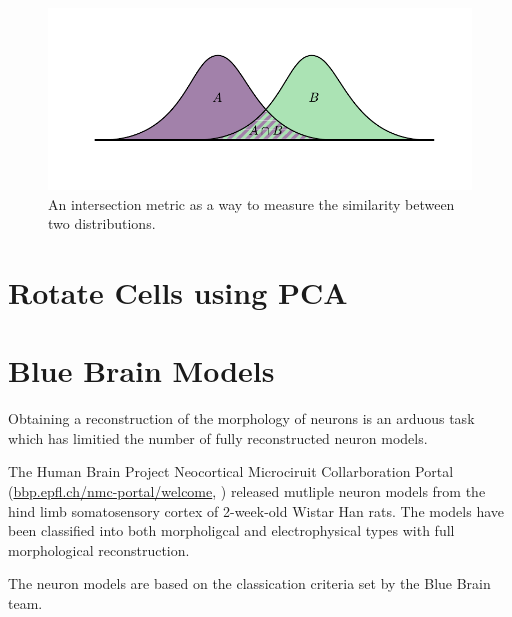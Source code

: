 \documentclass[altfont, fleqn]{uiophd}
\begin{document}
\begin{figure}[h]
    \begin{center}
        \includegraphics[width=1\textwidth]{images/sec_3/hist_inter.pdf}
        \caption{
            An intersection metric as a way to measure the similarity
            between two distributions.
        }
        \label{fig:3_hist_inter}
    \end{center}
\end{figure}
\section{Rotate Cells using PCA}
\label{sec:pca_analysis}
\section{Blue Brain Models}
\label{sec:blue_brain}
Obtaining a reconstruction of the morphology of neurons is an
arduous task which has limitied the number of fully
reconstructed neuron models.

The Human Brain Project Neocortical
Microciruit Collarboration Portal
(\url{bbp.epfl.ch/nmc-portal/welcome},
\textcite{ramaswamy_neocortical_2015})
released mutliple neuron models from the hind limb somatosensory cortex 
of 2-week-old Wistar Han rats.
The models have been classified into both morpholigcal and electrophysical
types with full morphological reconstruction. 

The neuron models are based on the classication criteria set by the Blue Brain 
team.
\end{document}
